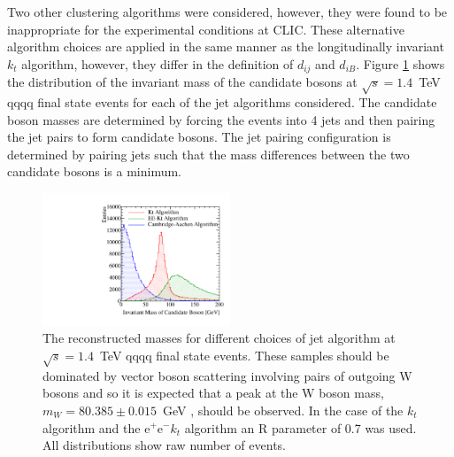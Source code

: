 \noindent Two other clustering algorithms were considered, however, they were found to be inappropriate for the experimental conditions at CLIC.  These alternative algorithm choices are applied in the same manner as the longitudinally invariant $k_{t}$ algorithm, however, they differ in the definition of $d_{ij}$ and $d_{iB}$.  Figure \ref{fig:invariantmassalgoveto} shows the distribution of the invariant mass of the candidate bosons at $\sqrt{s}=1.4$~TeV \nu{\nu}qqqq final state events for each of the jet algorithms considered.  The candidate boson masses are determined by forcing the events into 4 jets and then pairing the jet pairs to form candidate bosons.  The jet pairing configuration is determined by pairing jets such that the mass differences between the two candidate bosons is a minimum.  

\begin{figure}[h!]
\centering
\includegraphics[width=0.5\textwidth]{PhysicsAnalysis/Plots/SimpleInvMassPlot/InvariantMassesAlgorithmVeto.pdf}
\caption[The reconstructed masses for different choices of jet algorithm at $\sqrt{s}=1.4$~TeV \nu{\nu}qqqq final state events.  These samples should be dominated by vector boson scattering involving pairs of outgoing W bosons and so it is expected that a peak at the W boson mass, $m_{W} = 80.385 \pm 0.015$~GeV \cite{Beringer:1900zz}, should be observed.  In the case of the $k_{t}$ algorithm and the $\text{e}^{+}\text{e}^{-}k_{t}$  algorithm an R parameter of 0.7 was used.  All distributions show raw number of events.]{The reconstructed masses for different choices of jet algorithm at $\sqrt{s}=1.4$~TeV \nu{\nu}qqqq final state events.  These samples should be dominated by vector boson scattering involving pairs of outgoing W bosons and so it is expected that a peak at the W boson mass, $m_{W} = 80.385 \pm 0.015$~GeV \cite{Beringer:1900zz}, should be observed.  In the case of the $k_{t}$ algorithm and the $\text{e}^{+}\text{e}^{-}k_{t}$  algorithm an R parameter of 0.7 was used.  All distributions show raw number of events.}
\label{fig:invariantmassalgoveto}
\end{figure}

